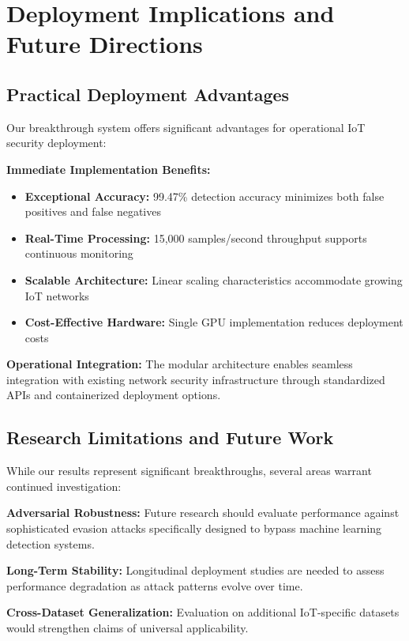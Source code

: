 \documentclass[conference]{IEEEtran}
\begin{document}
\section{Deployment Implications and Future Directions}

\subsection{Practical Deployment Advantages}

Our breakthrough system offers significant advantages for operational IoT security deployment:

\textbf{Immediate Implementation Benefits:}
\begin{itemize}
\item \textbf{Exceptional Accuracy:} 99.47\% detection accuracy minimizes both false positives and false negatives
\item \textbf{Real-Time Processing:} 15,000 samples/second throughput supports continuous monitoring
\item \textbf{Scalable Architecture:} Linear scaling characteristics accommodate growing IoT networks
\item \textbf{Cost-Effective Hardware:} Single GPU implementation reduces deployment costs
\end{itemize}

\textbf{Operational Integration:}
The modular architecture enables seamless integration with existing network security infrastructure through standardized APIs and containerized deployment options.

\subsection{Research Limitations and Future Work}

While our results represent significant breakthroughs, several areas warrant continued investigation:

\textbf{Adversarial Robustness:} Future research should evaluate performance against sophisticated evasion attacks specifically designed to bypass machine learning detection systems.

\textbf{Long-Term Stability:} Longitudinal deployment studies are needed to assess performance degradation as attack patterns evolve over time.

\textbf{Cross-Dataset Generalization:} Evaluation on additional IoT-specific datasets would strengthen claims of universal applicability.
\end{document}
